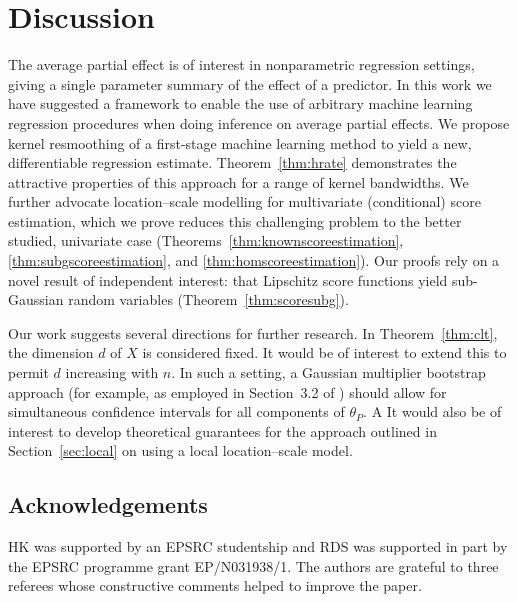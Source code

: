 \documentclass[aos]{imsart}
\begin{document}
	
	
	\section{Discussion}
	\label{sect:discussion}
	
	The average partial effect is of interest in nonparametric regression settings, giving a single parameter summary of the effect of a predictor. In this work we have suggested a framework to enable the use of arbitrary machine learning regression procedures when doing inference on average partial effects. We propose kernel resmoothing of a first-stage machine learning method to yield a new, differentiable regression estimate. Theorem~\ref{thm:hrate} demonstrates the attractive properties of this approach for a range of kernel bandwidths. We further advocate location--scale modelling for multivariate (conditional) score estimation, which we prove reduces this challenging problem to the better studied, univariate case (Theorems~\ref{thm:knownscoreestimation}, \ref{thm:subgscoreestimation}, and \ref{thm:homscoreestimation}). Our proofs rely on a novel result of independent interest: that Lipschitz score functions yield sub-Gaussian random variables (Theorem~\ref{thm:scoresubg}).
	
	Our work suggests several directions for further research. In Theorem~\ref{thm:clt}, the dimension $d$ of $X$ is considered fixed. It would be of interest to extend this to permit $d$ increasing with $n$. In such a setting, a Gaussian multiplier bootstrap approach (for example, as employed in Section~3.2 of \citet{ShahGCM}) should allow for simultaneous confidence intervals for all components of $\theta_P$. A It would also  be of interest to develop theoretical guarantees for the approach outlined in Section~\ref{sec:local} on using a local location--scale model.
	
	\subsection*{Acknowledgements}
	HK was supported by an EPSRC studentship and RDS was supported in part by the EPSRC programme grant EP/N031938/1.  The authors are grateful to three referees whose constructive comments helped to improve the paper.
	
	
		
	
	
\end{document}
